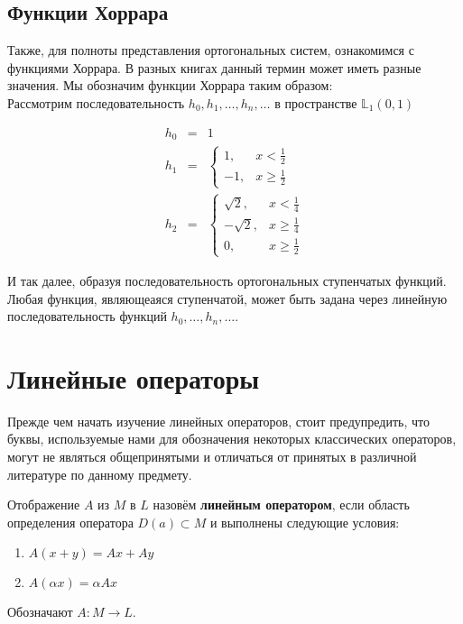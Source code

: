 \documentclass[12pt]{article}
\begin{document}
	\subsection*{Функции Хоррара}
	
	Также, для полноты представления ортогональных систем, ознакомимся с функциями Хоррара. В разных книгах данный термин
	может иметь разные значения. Мы обозначим функции Хоррара таким образом: \\
	Рассмотрим последовательность $h_0, h_1, \dots, h_n, \dots$ в пространстве $\mathbb{L}_1(0, 1)$
	
	\begin{eqnarray*}
		h_0& =& 1 \\		
		h_1& =& 
		\begin{cases}
			1, & x < \frac{1}{2} \\
			-1, & x \geq \frac{1}{2}
		\end{cases} \\		
		h_2& =& 
		\begin{cases}
			\sqrt{2}, & x < \frac{1}{4} \\
			-\sqrt{2}, & x \geq \frac{1}{4} \\
			0, & x \geq \frac{1}{2}
		\end{cases}
	\end{eqnarray*}
	
	И так далее, образуя последовательность ортогональных ступенчатых функций. Любая функция, являющеаяся ступенчатой, может
	быть задана через линейную последовательность функций $h_0, \dots, h_n, \dots$.
	
	\section*{Линейные операторы}
	
	Прежде чем начать изучение линейных операторов, стоит предупредить, что буквы, используемые нами для обозначения некоторых
	классических операторов, могут не являться общепринятыми и отличаться от принятых в различной литературе по данному предмету.
	
	\begin{defi}
		Отображение $A$ из $M$ в $L$ назовём \textbf{линейным оператором}, если область определения оператора
		$D(a) \subset M$ и выполнены следующие условия:
		\begin{enumerate}
			\item $A(x + y) = Ax + Ay$
			\item $A(\alpha x) = \alpha A x$ 
		\end{enumerate}
		Обозначают $A : M \rightarrow L$.
	\end{defi}
	
\end{document}
